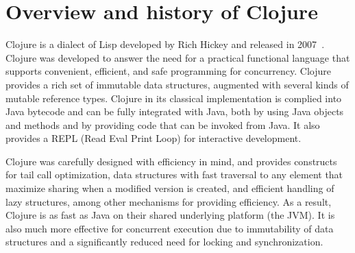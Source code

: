 \documentclass[submission,copyright,creativecommons]{eptcs}
\newcommand{\allcomments}[1]{{#1}}
\newcommand{\elenacomment}[1]{{\bf \textcolor{ForestGreen}{\allcomments{{#1}}}}}
\newcommand{\stephencomment}[1]{{\bf \color{StephensBlue}{\allcomments{{#1}}}}} %
\newcommand{\joecomment}[1]{{\bf \color{JoesGold}{\allcomments{{#1}}}}}
\newcommand{\todo}[1]{{\bf \color{magenta}{\allcomments{ To-do: {#1}}}}}
\begin{document}


\section{Overview and history of Clojure}
Clojure is a dialect of Lisp developed by Rich Hickey and released in 2007~\cite{Hickey:2008}. Clojure was developed to answer the need for a practical  functional language that supports convenient, efficient, and safe programming for concurrency. Clojure provides a rich set of immutable data structures, augmented with several kinds of mutable reference types. Clojure in its classical implementation is complied into Java bytecode and can be fully integrated with Java, both by using Java objects and methods and by providing code that can be invoked from Java. It also provides a REPL (Read Eval Print Loop) %
for interactive development.

Clojure was carefully designed with efficiency in mind, and provides constructs for tail call optimization,
data structures with fast traversal to any element that maximize sharing when a modified version is created, and efficient handling of lazy structures, among other mechanisms for providing efficiency. As a result, Clojure is as fast as Java on their shared underlying platform (the JVM). It is also much more effective 
for concurrent execution due to immutability of data structures and a significantly reduced need for locking and synchronization. 
\end{document}
